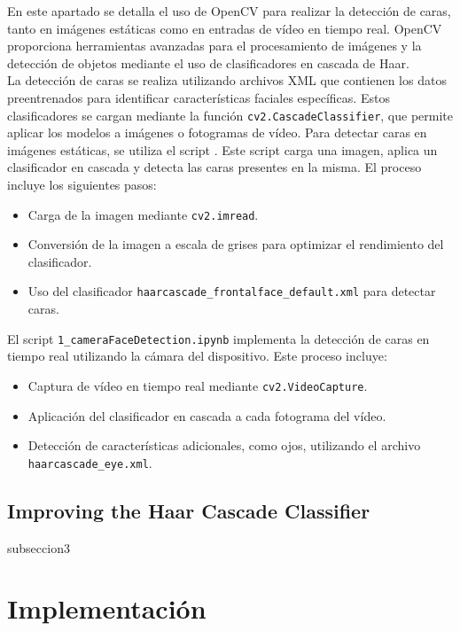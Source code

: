 \documentclass[a4paper]{article}
\begin{document}
En este apartado se detalla el uso de OpenCV para realizar la detección de caras, tanto en imágenes estáticas como en entradas de vídeo en tiempo real. OpenCV proporciona herramientas avanzadas para el procesamiento de imágenes y la detección de objetos mediante el uso de clasificadores en cascada de Haar.\\
La detección de caras se realiza utilizando archivos XML que contienen los datos preentrenados para identificar características faciales específicas. Estos clasificadores se cargan mediante la función \texttt{cv2.CascadeClassifier}, que permite aplicar los modelos a imágenes o fotogramas de vídeo.
Para detectar caras en imágenes estáticas, se utiliza el script \texttt{}. Este script carga una imagen, aplica un clasificador en cascada y detecta las caras presentes en la misma. El proceso incluye los siguientes pasos:
\begin{itemize}
    \item Carga de la imagen mediante \texttt{cv2.imread}.
    \item Conversión de la imagen a escala de grises para optimizar el rendimiento del clasificador.
    \item Uso del clasificador \texttt{haarcascade\_frontalface\_default.xml} para detectar caras.
\end{itemize}

El script \texttt{1\_cameraFaceDetection.ipynb} implementa la detección de caras en tiempo real utilizando la cámara del dispositivo. Este proceso incluye:
\begin{itemize}
    \item Captura de vídeo en tiempo real mediante \texttt{cv2.VideoCapture}.
    \item Aplicación del clasificador en cascada a cada fotograma del vídeo.
    \item Detección de características adicionales, como ojos, utilizando el archivo \texttt{haarcascade\_eye.xml}.
\end{itemize}

\subsection{Improving the Haar Cascade Classifier}

subseccion3

\section{Implementación}
\end{document}
